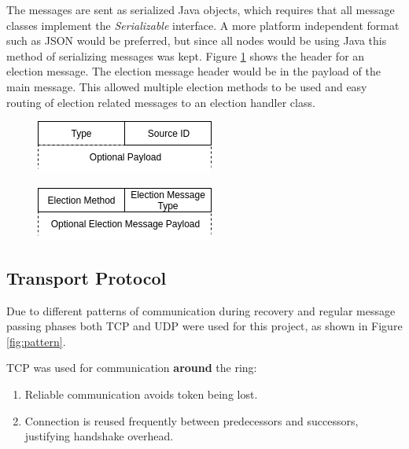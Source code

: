 \documentclass[12pt]{article}
\begin{document}
The messages are sent as serialized Java objects, which requires that all message classes implement the \emph{Serializable} interface. A more platform independent format such as JSON would be preferred, but since all nodes would be using Java this method of serializing messages was kept. Figure \ref{fig:elecmsg} shows the header for an election message. The election message header would be in the payload of the main message. This allowed multiple election methods to be used and easy routing of election related messages to an election handler class.

\begin{figure}[!ht]
\centering
\begin{minipage}{.5\textwidth}
  \centering
  \includegraphics[width=.8\linewidth]{images/mainmsg}
  \label{fig:mainmsg}
\end{minipage}%
\begin{minipage}{.5\textwidth}
  \centering
  \includegraphics[width=.8\linewidth]{images/elecmsg}
  \label{fig:elecmsg}
\end{minipage}
\end{figure}

\subsection{Transport Protocol}

Due to different patterns of communication during recovery and regular message passing phases both TCP and UDP were used for this project, as shown in Figure \ref{fig:pattern}.

\noindent \linebreak TCP was used for communication \textbf{around} the ring:
\begin{enumerate}
    \item Reliable communication avoids token being lost.
    \item Connection is reused frequently between predecessors and successors, justifying handshake overhead.
\end{enumerate}
\end{document}
